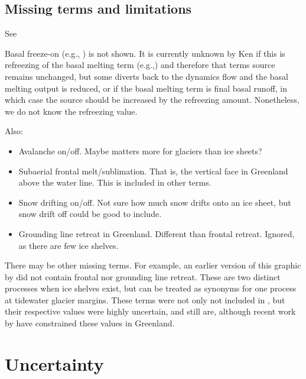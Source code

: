 \documentclass[review,jog]{igs}
\begin{document}

\subsection{Missing terms and limitations}

See \citet[Fig. 2]{cogley_2011}

Basal freeze-on (e.g., \citet{bell_2014}) is not shown. It is currently unknown by Ken if this is refreezing of the basal melting term (e.g.,\citet{karlsson_2021}) and therefore that terms source remains unchanged, but some diverts back to the dynamics flow and the basal melting output is reduced, or if the basal melting term is final basal runoff, in which case the source should be increased by the refreezing amount. Nonetheless, we do not know the refreezing value.

Also:
\begin{itemize}
\item Avalanche on/off. Maybe matters more for glaciers than ice sheets?
\item Subaerial frontal melt/sublimation. That is, the vertical face in Greenland above the water line. This is included in other terms.
\item Snow drifting on/off. Not sure how much snow drifts onto an ice sheet, but snow drift off could be good to include.
\item Grounding line retreat in Greenland. Different than frontal retreat. Ignored, as there are few ice shelves.
\end{itemize}

There may be other missing terms. For example, an earlier version of this graphic by \citet[Fig. 2]{cogley_2011} did not contain frontal nor grounding line retreat. These are two distinct processes when ice shelves exist, but can be treated as synonyms for one process at tidewater glacier margins. These terms were not only not included in \citet{cogley_2011}, but their respective values were highly uncertain, and still are, although recent work by \citet{kochtitzky_2023,greene_2024} have constrained these values in Greenland. 

\section{Uncertainty}
\end{document}
